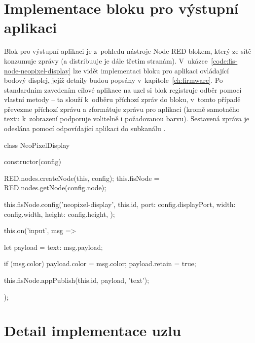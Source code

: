 \section{Implementace bloku pro výstupní aplikaci}\label{sec:implementace-bloku-pro-vystupni-aplikace}
Blok pro výstupní aplikaci je z~pohledu nástroje Node-RED blokem, který ze sítě konzumuje zprávy (a distribuuje je
dále třetím stranám).
V~ukázce~\ref{code:fis-node-neopixel-display} lze vidět implementaci bloku pro aplikaci ovládající bodový displej,
jejíž detaily budou popsány v~kapitole~\ref{ch:firmware}.
Po standardním zavedením cílové aplikace na uzel si blok registruje odběr pomocí vlastní metody  -- ta slouží
k~odběru příchozí zpráv do bloku, v~tomto případě převezme příchozí zprávu a zformátuje zprávu pro aplikaci
(kromě samotného textu k~zobrazení podporuje volitelně i požadovanou barvu).
Sestavená zpráva je odeslána pomocí  odpovídající aplikaci do subkanálu .

\begin{code}[
    language=Javascript,
    label=code:fis-node-neopixel-display,
    caption={Implementace bloku pro aplikaci ovládající bodový displej -- kromě samotné konfigurace na cílovém uzlu
    si uzel zaregistruje funkci pro odběr události typu \ic{\'input\'}.
    Událost tohoto typu notifikuje blok o~příchozí zprávě, které je v~tomto případě odeslána do aplikace k~zobrazení
    na displeji.}
]
class NeoPixelDisplay {
    constructor(config) {
        RED.nodes.createNode(this, config);
        this.fisNode = RED.nodes.getNode(config.node);

        this.fisNode.config('neopixel-display', this.id, {
            port: config.displayPort,
            width: config.width,
            height: config.height,
        });

        this.on('input', msg => {
            let payload = {text: msg.payload};

            if (msg.color)
                payload.color = msg.color;
            payload.retain = true;

            this.fisNode.appPublish(this.id, payload, 'text');
        });
    }
}
\end{code}

\section{Detail implementace uzlu}
